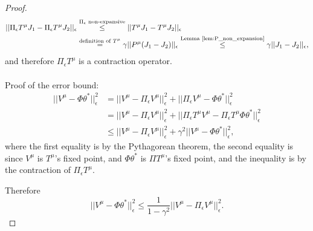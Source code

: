 \begin{proof}
\begin{equation*}
\begin{split}
||\Pi_\epsilon T^\mu {J}_1 - \Pi_\epsilon T^\mu {J}_2||_\epsilon &\overset{\Pi_\epsilon \textrm{ non-expansive}}{\le} ||T^\mu {J}_1 - T^\mu {J}_2||_\epsilon\\
&\overset{\textrm{definition of } T^\mu}{=} \gamma||P^\mu({J}_1-{J}_2)||_\epsilon \overset{\textrm{Lemma \ref{lem:P_non_expansion}}}{\le} \gamma||{J}_1-{J}_2||_\epsilon ,
\end{split}
\end{equation*}
and therefore $\Pi_\epsilon T^\mu$ is a contraction operator.
\\
\\
Proof of the error bound:
\begin{equation}
\begin{split}
  ||V^\mu - \Phi \theta^*||_\epsilon^2  &= ||V^\mu
-\Pi_\epsilon V^\mu||_\epsilon^2 + ||\Pi_\epsilon V^\mu -\Phi \theta^*||_\epsilon^2  \\
    &= ||V^\mu -\Pi_\epsilon V^\mu||_\epsilon^2 + ||\Pi_\epsilon T^\mu V^\mu -\Pi_\epsilon T^\mu\Phi \theta^*||_\epsilon^2 \\
&\leq ||V^\mu -\Pi_\epsilon V^\mu||_\epsilon^2 + \gamma^2||V^\mu-\Phi \theta^*||_\epsilon^2,
\end{split}
\end{equation}
where the first equality is by the Pythagorean theorem, the second equality is since $V^\mu$ is $T^\mu$'s fixed point, and $\Phi \theta^*$ is $\Pi T^\mu$'s fixed point, and the inequality is by the contraction of $\Pi_\epsilon T^\mu$.

Therefore
$$||V^\mu - \Phi \theta^*||_\epsilon^2 \le \frac{1}{1-\gamma^2}||V^\mu-\Pi_\epsilon V^\mu||_\epsilon^2.$$
\end{proof}

